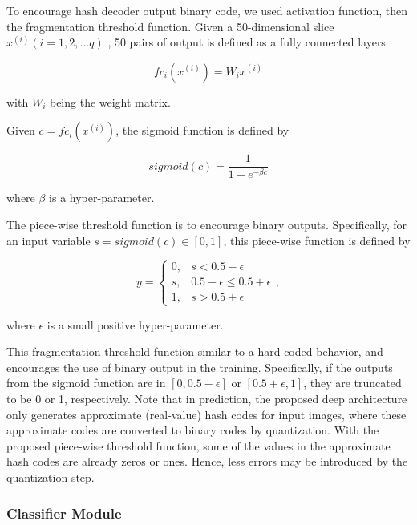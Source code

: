 To encourage hash decoder output binary code, 
we used activation function, then the 
fragmentation threshold function.
Given a 50-dimensional slice 
$x^{(i)}(i=1,2,...q)$
, 50 pairs of output is defined as a fully 
connected layers

\begin{equation}
    \label{eq:eq_descr_1}
    fc_i(x^{(i)}) = W_ix^{(i)}
\end{equation}

with $W_i$ being the weight matrix.

Given $c=fc_i(x^{(i)})$, the sigmoid function
is defined by 

\begin{equation}
    \label{eq:eq_descr_2}
    sigmoid(c) = \frac{1}{1+e^{-\beta c}}
\end{equation}

where $\beta$ is a hyper-parameter.

The piece-wise threshold function is to 
encourage binary outputs. Specifically, for an 
input variable $s = sigmoid(c) \in [0,1]$, 
this piece-wise function is defined by

\begin{equation}
    \label{eq:eq_descr_3}
    y = \left\{
        \begin{array}{lr}
            0, & s < 0.5-\epsilon \\
            s, & 0.5-\epsilon \le 0.5+\epsilon \\
            1, & s > 0.5+\epsilon
        \end{array}
    \right.\nonumber,
\end{equation}

where $\epsilon$ is a small positive 
hyper-parameter.

This fragmentation threshold function similar 
to a hard-coded behavior, and encourages the 
use of binary output in the training. 
Specifically, if the outputs from the sigmoid 
function are in $[0, 0.5-\epsilon]$ or 
$[0.5+\epsilon, 1]$, they are truncated to be 
0 or 1, respectively. Note that in prediction, 
the proposed deep architecture only generates 
approximate (real-value) hash codes for input 
images, where these approximate codes are 
converted to binary codes by quantization. 
With the proposed piece-wise threshold 
function, some of the values in the 
approximate hash codes are already zeros or 
ones. Hence, less errors may be introduced
by the quantization step.

\subsubsection{Classifier Module}
\label{sec:MethNetCls}

